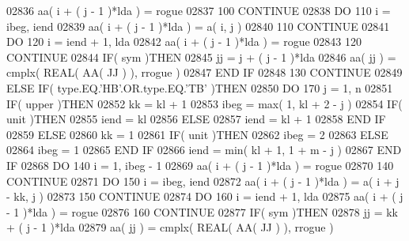 \begin{DoxyCode}
02836                aa( i + ( j - 1 )*lda ) = rogue
02837   100       \textcolor{keywordflow}{CONTINUE}
02838             \textcolor{keywordflow}{DO} 110 i = ibeg, iend
02839                aa( i + ( j - 1 )*lda ) = a( i, j )
02840   110       \textcolor{keywordflow}{CONTINUE}
02841             \textcolor{keywordflow}{DO} 120 i = iend + 1, lda
02842                aa( i + ( j - 1 )*lda ) = rogue
02843   120       \textcolor{keywordflow}{CONTINUE}
02844             \textcolor{keywordflow}{IF}( sym )\textcolor{keywordflow}{THEN}
02845                jj = j + ( j - 1 )*lda
02846                aa( jj ) = cmplx( \textcolor{keywordtype}{REAL( AA( JJ ) )}, rrogue )
02847 \textcolor{keywordflow}{            END IF}
02848   130    \textcolor{keywordflow}{CONTINUE}
02849       \textcolor{keywordflow}{ELSE} \textcolor{keywordflow}{IF}( type.EQ.\textcolor{stringliteral}{'HB'}.OR.type.EQ.\textcolor{stringliteral}{'TB'} )\textcolor{keywordflow}{THEN}
02850          \textcolor{keywordflow}{DO} 170 j = 1, n
02851             \textcolor{keywordflow}{IF}( upper )\textcolor{keywordflow}{THEN}
02852                kk = kl + 1
02853                ibeg = max( 1, kl + 2 - j )
02854                \textcolor{keywordflow}{IF}( unit )\textcolor{keywordflow}{THEN}
02855                   iend = kl
02856                \textcolor{keywordflow}{ELSE}
02857                   iend = kl + 1
02858 \textcolor{keywordflow}{               END IF}
02859             \textcolor{keywordflow}{ELSE}
02860                kk = 1
02861                \textcolor{keywordflow}{IF}( unit )\textcolor{keywordflow}{THEN}
02862                   ibeg = 2
02863                \textcolor{keywordflow}{ELSE}
02864                   ibeg = 1
02865 \textcolor{keywordflow}{               END IF}
02866                iend = min( kl + 1, 1 + m - j )
02867 \textcolor{keywordflow}{            END IF}
02868             \textcolor{keywordflow}{DO} 140 i = 1, ibeg - 1
02869                aa( i + ( j - 1 )*lda ) = rogue
02870   140       \textcolor{keywordflow}{CONTINUE}
02871             \textcolor{keywordflow}{DO} 150 i = ibeg, iend
02872                aa( i + ( j - 1 )*lda ) = a( i + j - kk, j )
02873   150       \textcolor{keywordflow}{CONTINUE}
02874             \textcolor{keywordflow}{DO} 160 i = iend + 1, lda
02875                aa( i + ( j - 1 )*lda ) = rogue
02876   160       \textcolor{keywordflow}{CONTINUE}
02877             \textcolor{keywordflow}{IF}( sym )\textcolor{keywordflow}{THEN}
02878                jj = kk + ( j - 1 )*lda
02879                aa( jj ) = cmplx( \textcolor{keywordtype}{REAL( AA( JJ ) )}, rrogue )

\end{DoxyCode}
